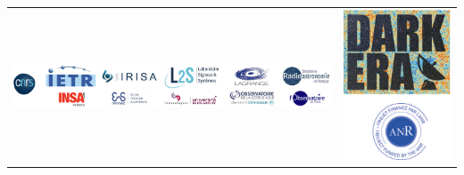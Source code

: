 \documentclass{beamer}
\begin{document}
{\begin{tabular*}{\textwidth}{lr}
  \includegraphics[scale=0.8]{partenaires_DARK-ERA} &
\includegraphics[scale=1.0]{logo_DARK-ERA_avec_ANR} \\
  \end{tabular*}

}
\end{document}
